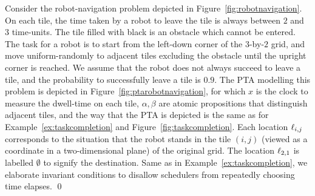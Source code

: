 \begin{example}\label{ex:robotnavigation}
Consider the robot-navigation problem depicted in Figure~\ref{fig:robotnavigation}.
On each tile, the time taken by a robot to leave the tile is always between $2$ and $3$ time-units.
The tile filled with black is an obstacle which cannot be entered.
The task for a robot is to start from the left-down corner of the $3$-by-$2$ grid, and move uniform-randomly to adjacent tiles excluding the obstacle until the upright corner is reached.
We assume that the robot does not always succeed to leave a tile, and the probability to successfully leave a tile is $0.9$.
The PTA modelling this problem is depicted in Figure~\ref{fig:ptarobotnavigation},
for which $x$ is the clock to measure the dwell-time on each tile, $\alpha,\beta$ are atomic propositions that distinguish adjacent tiles, and the way that the PTA is depicted is the same as for Example~\ref{ex:taskcompletion} and Figure~\ref{fig:taskcompletion}.
Each location $\ell_{i,j}$ corresponds to the situation that the robot stands in the tile $(i,j)$ (viewed as a coordinate in a two-dimensional plane) of the original grid.
The location $\ell_{2,1}$ is labelled $\emptyset$ to signify the destination.
Same as in Example~\ref{ex:taskcompletion}, we elaborate invariant conditions to disallow schedulers from repeatedly choosing time elapses. \qed
\end{example}

